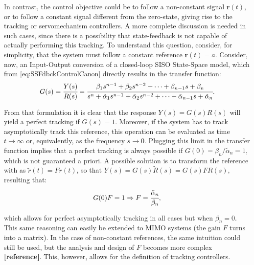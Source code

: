 \documentclass[a4paper,11pt]{book}
\numberwithin{figure}{chapter}
\numberwithin{equation}{chapter}
\numberwithin{table}{chapter}
\theoremstyle{definition}
\begin{document}
In contrast, the control objective could be to follow a non-constant signal $\bm{r}(t)$, or to follow a constant signal different from the zero-state, giving rise to the tracking or servomechanism controllers. A more complete discussion is needed in such cases, since there is a possibility that state-feedback is not capable of actually performing this tracking. To understand this question, consider, for simplicity, that the system must follow a constant reference $\bm{r}(t) = a$. Consider, now, an Input-Output conversion of a closed-loop SISO State-Space model, which from \eqref{eq:SSFdbckControlCanon} directly results in the transfer function:
\begin{equation}
    G(s) = \cfrac{Y(s)}{R(s)} = \cfrac{\beta_1 s^{n-1} + \beta_2 s^{n-2} + \cdots + \beta_{n-1} s + \beta_n}{s^{n} + \tilde{\alpha}_1 s^{n-1} + \tilde{\alpha}_2 s^{n-2} + \cdots + \tilde{\alpha}_{n-1} s + \tilde{\alpha}_n}
.\end{equation}

From that formulation it is clear that the response $Y(s) = G(s)R(s)$ will yield a perfect tracking if $G(s) = 1$. Moreover, if the system has to track asymptotically track this reference, this operation can be evaluated as time $t \to \infty$ or, equivalently, as the frequency $s \to 0$. Plugging this limit in the transfer function implies that a perfect tracking is always possible if $G(0) = \beta_n /  \tilde{\alpha}_n = 1$, which is not guaranteed a priori. A possible solution is to transform the reference with as $\tilde{r}(t) = F r(t)$, so that $Y(s) = G(s)\tilde{R}(s) = G(s) F R(s)$, resulting that:
\begin{equation}
    G(0) F = 1 \Rightarrow F = \cfrac{\tilde{\alpha}_n}{\beta_n}
,\end{equation}

\noindent which allows for perfect asymptotically tracking in all cases but when $\beta_n = 0$. This same reasoning can easily be extended to MIMO systems (the gain $F$ turns into a matrix). In the case of non-constant references, the same intuition could still be used, but the analysis and design of $F$ becomes more complex \textbf{[reference]}. This, however, allows for the definition of tracking controllers.
\end{document}
